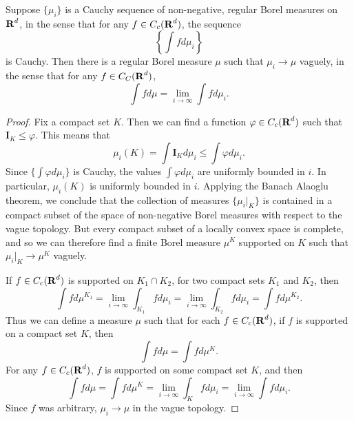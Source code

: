 \begin{lemma} \label{weakstarcompleteness}
	Suppose $\{ \mu_i \}$ is a Cauchy sequence of non-negative, regular Borel measures on $\operatorname{\mathbf{R}}^d$, in the sense that for any $f \in C_c(\operatorname{\mathbf{R}}^d)$, the sequence
	\[ \left\{ \int f d\mu_i \right\} \]
	is Cauchy. Then there is a regular Borel measure $\mu$ such that $\mu_i \to \mu$ vaguely, in the sense that for any $f \in C_C(\operatorname{\mathbf{R}}^d)$,
	\[ \int f d\mu = \lim_{i \to \infty} \int f d\mu_i. \]
\end{lemma}
\begin{proof}
	Fix a compact set $K$. Then we can find a function $\varphi \in C_c(\operatorname{\mathbf{R}}^d)$ such that $\mathbf{I}_K \leq \varphi$. This means that
	\[ \mu_i(K) = \int \mathbf{I}_K d\mu_i \leq \int \varphi d\mu_i. \]
	Since $\{ \int \varphi d\mu_i \}$ is Cauchy, the values $\int \varphi d\mu_i$ are uniformly bounded in $i$. In particular, $\mu_i(K)$ is uniformly bounded in $i$. Applying the Banach Alaoglu theorem, we conclude that the collection of measures $\{ \mu_i|_K \}$ is contained in a compact subset of the space of non-negative Borel measures with respect to the vague topology. But every compact subset of a locally convex space is complete, and so we can therefore find a finite Borel measure $\mu^K$ supported on $K$ such that $\mu_i|_K \to \mu^K$ vaguely.

	If $f \in C_c(\operatorname{\mathbf{R}}^d)$ is supported on $K_1 \cap K_2$, for two compact sets $K_1$ and $K_2$, then
	\[ \int f d\mu^{K_1} = \lim_{i \to \infty} \int_{K_1} f d\mu_i = \lim_{i \to \infty} \int_{K_2} f d \mu_i = \int f d\mu^{K_2}. \]
	Thus we can define a measure $\mu$ such that for each $f \in C_c(\operatorname{\mathbf{R}}^d)$, if $f$ is supported on a compact set $K$, then
	\[ \int f d\mu = \int f d\mu^K. \]
	For any $f \in C_c(\operatorname{\mathbf{R}}^d)$, $f$ is supported on some compact set $K$, and then
	\[ \int f d\mu = \int f d\mu^K = \lim_{i \to \infty} \int_K f d\mu_i = \lim_{i \to \infty} \int f d\mu_i. \]
	Since $f$ was arbitrary, $\mu_i \to \mu$ in the vague topology.
\end{proof}

